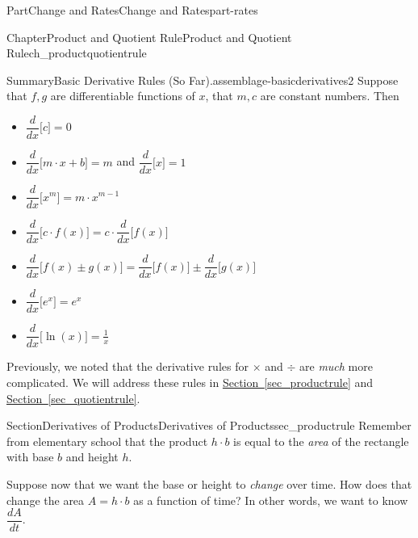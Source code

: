 \documentclass[oneside,10pt,]{tufte-book}
\newcommand{\xreffont}{\relax}
\numberwithin{equation}{chapter}
\newcommand{\ddx}[1]{ \dfrac{d}{dx} \Big[ #1 \Big]  }
\begin{document}
\begin{partptx}{Part}{Change and Rates}{}{Change and Rates}{}{}{part-rates}
\begin{chapterptx}{Chapter}{Product and Quotient Rule}{}{Product and Quotient Rule}{}{}{ch_productquotientrule}
\begin{introduction}{}
\begin{assemblage}{Summary}{Basic Derivative Rules (So Far).}{assemblage-basicderivatives2}
Suppose that \(f,g\) are differentiable functions of \(x\), that \(m,c\) are constant numbers.  Then%
\begin{itemize}[label=\textbullet]
\item{}\(\displaystyle \ddx{c}=0\)%
\item{}\(\ddx{m\cdot x+b}=m\) and \(\ddx{x} = 1\)%
\item{}\(\displaystyle \ddx{x^m}=m\cdot x^{m-1}\)%
\item{}\(\displaystyle \ddx{ c\cdot f(x)}=c\cdot \ddx{f(x)}\)%
\item{}\(\displaystyle \ddx{f(x) \pm g(x)} = \ddx{f(x)} \pm \ddx{g(x)}\)%
\item{}\(\displaystyle \ddx{ e^x } = e^x \)%
\item{}\(\displaystyle \ddx{ \ln(x) } = \frac{1}{x}\)%
\end{itemize}
%
\end{assemblage}
Previously, we noted that the derivative rules for \(\times\) and \(\div\) are \emph{much} more complicated.  We will address these rules in \hyperref[sec_productrule]{Section~{\xreffont\ref{sec_productrule}}} and \hyperref[sec_quotientrule]{Section~{\xreffont\ref{sec_quotientrule}}}.%
\end{introduction}%
%
%
\typeout{************************************************}
\typeout{************************************************}
%
\begin{sectionptx}{Section}{Derivatives of Products}{}{Derivatives of Products}{}{}{sec_productrule}
Remember from elementary school that the product \(h\cdot b\) is equal to the \emph{area} of the rectangle with base \(b\) and height \(h\).%
\par
Suppose now that we want the base or height to \emph{change} over time.  How does that change the area \(A = h\cdot b\) as a function of time? In other words, we want to know \(\dfrac{dA}{dt}\).%
\begin{image}{0.375}{0.25}{0.375}{}%
\end{image}
\end{sectionptx}
\end{chapterptx}
\end{partptx}
\end{document}
